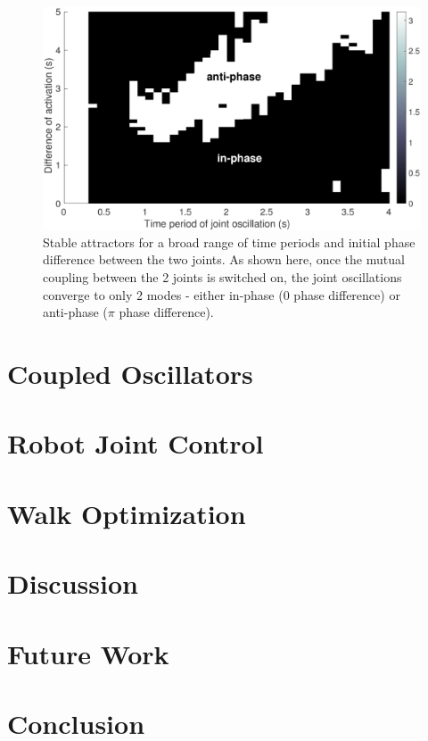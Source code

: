 \documentclass[12pt,twoside]{article}
\theoremstyle{plain}
\theoremstyle{definition}
\theoremstyle{remark}
\begin{document}
\begin{figure}[H]
\centering
\includegraphics[scale=0.55]{figures/5-1-stable-attractors.eps}
\caption{Stable attractors for a broad range of time periods and initial phase difference between the two joints. As shown here, once the mutual coupling between the 2 joints is switched on, the joint oscillations converge to only 2 modes - either in-phase (0 phase difference) or anti-phase ($\pi$ phase difference).}
\label{fig:stable-attractors}
\end{figure}

\section{Coupled Oscillators}
\label{sec:Coupled_Oscillators}

\section{Robot Joint Control}
\label{sec:Robot_Joint_Control}

\section{Walk Optimization}
\label{sec:Walk_Optimization}

\section{Discussion}
\label{sec:Discussion}

\section{Future Work}
\label{sec:Future_Work}

\section{Conclusion}
\label{sec:Conclusion}

\cite{ronsse2009computational, williamson1998neural, matsuoka1987mechanisms, matsuoka1985sustained,Ishiguro2003}

%
%


\end{document}
